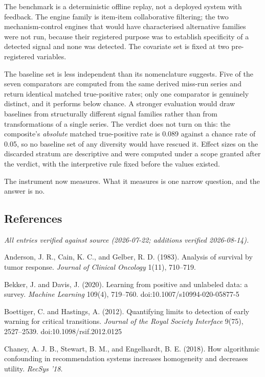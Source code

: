 \documentclass[
  11pt,
]{article}
\newcounter{none} %
\begin{document}
The benchmark is a deterministic offline replay, not a deployed system
with feedback. The engine family is item-item collaborative filtering;
the two mechanism-control engines that would have characterised
alternative families were not run, because their registered purpose was
to establish specificity of a detected signal and none was detected. The
covariate set is fixed at two pre-registered variables.

The baseline set is less independent than its nomenclature suggests.
Five of the seven comparators are computed from the same derived
miss-run series and return identical matched true-positive rates; only
one comparator is genuinely distinct, and it performs below chance. A
stronger evaluation would draw baselines from structurally different
signal families rather than from transformations of a single series. The
verdict does not turn on this: the composite's \emph{absolute} matched
true-positive rate is 0.089 against a chance rate of 0.05, so no
baseline set of any diversity would have rescued it. Effect sizes on the
discarded stratum are descriptive and were computed under a scope
granted after the verdict, with the interpretive rule fixed before the
values existed.

The instrument now measures. What it measures is one narrow question,
and the answer is no.

\subsection{References}\label{references}
\sloppy

\emph{All entries verified against source (2026-07-22; additions
verified 2026-08-14).}

Anderson, J. R., Cain, K. C., and Gelber, R. D. (1983). Analysis of
survival by tumor response. \emph{Journal of Clinical Oncology} 1(11),
710--719.

Bekker, J. and Davis, J. (2020). Learning from positive and unlabeled
data: a survey. \emph{Machine Learning} 109(4), 719--760.
doi:10.1007/s10994-020-05877-5

Boettiger, C. and Hastings, A. (2012). Quantifying limits to detection
of early warning for critical transitions. \emph{Journal of the Royal
Society Interface} 9(75), 2527--2539. doi:10.1098/rsif.2012.0125

Chaney, A. J. B., Stewart, B. M., and Engelhardt, B. E. (2018). How
algorithmic confounding in recommendation systems increases homogeneity
and decreases utility. \emph{RecSys '18}.
\end{document}
